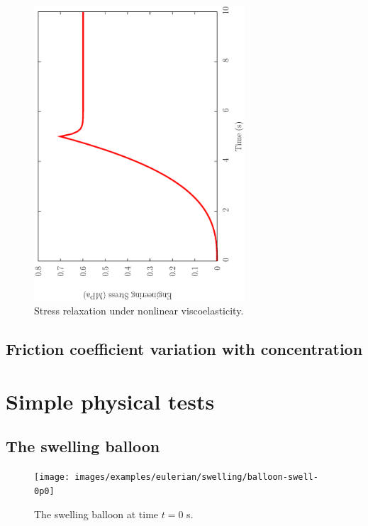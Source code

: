 \begin{figure}[!hpt]
\centering
\includegraphics[width=0.7\textwidth,angle=270]{images/examples/eulerian/viscoelasticity/nonlinear-viscoelasticity-stress-relaxation}
\caption{Stress relaxation under nonlinear viscoelasticity.}
\label{nonlinear-viscoelasticity-stress-relaxation}
\end{figure}

\subsection{Friction coefficient variation with concentration}
\label{variable-friction-coefficient}

\section{Simple physical tests}
\label{simple-physics}

\subsection{The swelling balloon}
\label{balloon}

\begin{figure}[!hpt]
\centering
\texttt{[image: images/examples/eulerian/swelling/balloon-swell-0p0]}
\caption{The swelling balloon at time $t=0$ s.} 
\label{swelling-balloon-image-0p0}
\end{figure}


